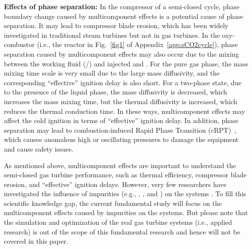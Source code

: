 \textbf{Effects of phase separation:}
In the compressor of a semi-closed  cycle, phase boundary change caused by multicomponent effects is a potential cause of phase separation. It may lead to compressor blade erosion, which has been widely investigated in traditional steam turbines \cite{ahmad2009experimental} but not in  gas turbines. %
In the  oxy-combustor (i.e., the reactor in Fig.~\ref{fig1} of Appendix~\ref{app:sCO2cycle}), phase separation caused by multicomponent effects may also occur due to the mixing between the working fluid (/) and injected  and . For the pure gas phase, the mass mixing time scale is very small due to the large mass diffusivity, and the corresponding ``effective'' ignition delay is also short. For a two-phase state, due to the presence of the liquid phase, the mass diffusivity is decreased, which increases the mass mixing time, but the thermal diffusivity is increased, which reduces the thermal conduction time. In these ways, multicomponent effects may affect the cold ignition in terms of ``effective'' ignition delay. In addition, phase separation may lead to combustion-induced Rapid Phase Transition (cRPT)~\citep{basco2013effect}, which causes anomalous high or oscillating pressures to damage the equipment and cause safety issues.

As mentioned above, multicomponent effects are important to understand the semi-closed  gas turbine performance, such as thermal efficiency, compressor blade erosion, and ``effective'' ignition delays. However, very few researchers have investigated the influence of impurities (e.g., , , and ) on the  systems \cite{vesely2019effect,pint2018effect}. 
To fill this scientific knowledge gap, the current fundamental study will focus on the multicomponent effects caused by impurities on the  systems. %
But please note that the simulation and optimization of the real  gas turbine systems (i.e., applied research) is out of the scope of this fundamental research and hence will not be covered in this paper. 

